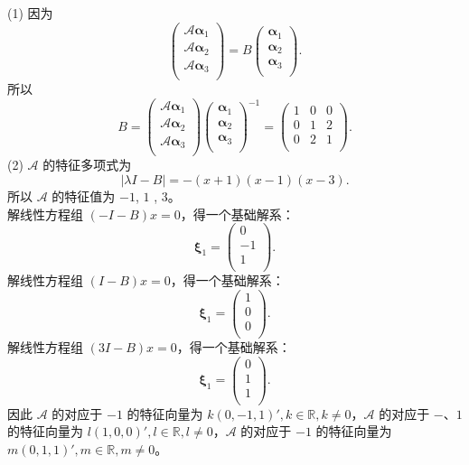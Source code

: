\begin{enumerate}[1~]
\begin{solution}
(1) 因为\[
\left( \begin{array}{c}
	\mathscr{A}\boldsymbol{\alpha} _1\\
	\mathscr{A}\boldsymbol{\alpha} _2\\
	\mathscr{A}\boldsymbol{\alpha} _3\\
\end{array} \right) =B\left( \begin{array}{c}
	\boldsymbol{\alpha} _1\\
	\boldsymbol{\alpha} _2\\
	\boldsymbol{\alpha} _3\\
\end{array} \right) .
\]
所以\[
B=\left( \begin{array}{c}
	\mathscr{A}\boldsymbol{\alpha} _1\\
	\mathscr{A}\boldsymbol{\alpha} _2\\
	\mathscr{A}\boldsymbol{\alpha} _3\\
\end{array} \right) \left( \begin{array}{c}
	\boldsymbol{\alpha} _1\\
	\boldsymbol{\alpha} _2\\
	\boldsymbol{\alpha} _3\\
\end{array} \right) ^{-1}=\left(
\begin{array}{ccc}
 1 & 0 & 0 \\
 0 & 1 & 2 \\
 0 & 2 & 1 \\
\end{array}
\right).
\]
(2) $\mathscr{A}$ 的特征多项式为\[
|\lambda I-B|=-(x+1) (x-1) (x-3).
\]
所以 $\mathscr{A}$ 的特征值为 $-1$, $1$ , $3$。\\
解线性方程组 $(-I-B)x=0$，得一个基础解系：\[
\boldsymbol{\xi}_1=\left( \begin{array}{c}
	0\\
	-1\\
	1\\
\end{array} \right) .
\]
解线性方程组 $(I-B)x=0$，得一个基础解系：\[
\boldsymbol{\xi}_1=\left( \begin{array}{c}
	1\\
	0\\
	0\\
\end{array} \right) .
\]
解线性方程组 $(3I-B)x=0$，得一个基础解系：\[
\boldsymbol{\xi}_1=\left( \begin{array}{c}
	0\\
	1\\
	1\\
\end{array} \right) .
\]
因此 $\mathscr{A}$ 的对应于 $-1$ 的特征向量为 $k(0, -1, 1)', k\in \mathbb{R}, k\ne 0$，$\mathscr{A}$ 的对应于 $-、1$ 的特征向量为 $l(1, 0, 0)', l\in \mathbb{R}, l\ne 0$，$\mathscr{A}$ 的对应于 $-1$ 的特征向量为 $m(0, 1, 1)', m\in \mathbb{R}, m\ne 0$。
\end{solution}


\end{enumerate}
